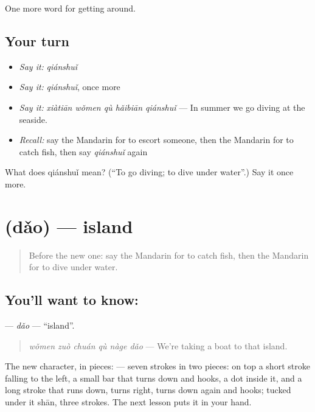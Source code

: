 \begin{grammarlens}[title={What you've built}]
One more word for getting around.
\end{grammarlens}

\subsection*{Your turn}
\begin{itemize}
\raggedright
  \item \emph{Say it:} \emph{qiánshuǐ}
  \item \emph{Say it:} \emph{qiánshuǐ}, once more
  \item \emph{Say it:} \emph{xiàtiān wǒmen qù hǎibiān qiánshuǐ} — In summer we go diving at the seaside.
  \item \emph{Recall:} say the Mandarin for to escort someone, then the Mandarin for to catch fish, then say \emph{qiánshuǐ} again
\end{itemize}

\begin{tcolorbox}[breakable,colback=teal!4,colframe=teal!35!black,title={Before you move on}]
What does qiánshuǐ mean? (\textquotedblleft{}To go diving; to dive under water\textquotedblright{}.) Say it once more.
\end{tcolorbox}
\section[\texorpdfstring{\zh{岛} (dǎo)}{岛 (dǎo)}]{ (dǎo) — island}

\label{lesson:ZH-C444-dao}



\begin{quote}
Before the new one: say the Mandarin for to catch fish, then the Mandarin for to dive under water.
\end{quote}

\subsection*{You'll want to know: }
\textbf{} — \emph{dǎo} — \textquotedblleft{}island\textquotedblright{}.

\begin{quote}
\textbf{} \emph{wǒmen zuò chuán qù nàge dǎo} — We're taking a boat to that island.
\end{quote}

The new character, in pieces:  — seven strokes in two pieces: on top a short stroke falling to the left, a small bar that turns down and hooks, a dot inside it, and a long stroke that runs down, turns right, turns down again and hooks; tucked under it  shān, three strokes. The next lesson puts it in your hand.

